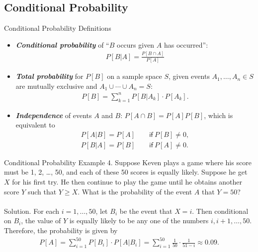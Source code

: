 \documentclass[hyperref={pdfpagelabels=false}]{beamer}
\newcommand{\U}{\mathsf}
\newcommand{\highlightg}[1]{\textcolor[rgb]{0.1,0.5,0.3}{\emph{\textbf{#1}}}}
\newcommand{\structb}[1]{\textcolor[rgb]{0.2,0.2,0.7}{#1}}
\begin{document}
\subsection{Conditional Probability}
%
\begin{frame}{Conditional Probability}
    \structb{Definitions}
    \begin{itemize}
    	\justifying
    	\item \highlightg{Conditional probability} of ``$B$ occurs given $A$ has occurred'': 
    	\begin{align*}
    	    P[B|A] = \frac{P[B\cap A]}{P[A]}
    	\end{align*}
    	\item \highlightg{Total probability} for $P[B]$ on a sample space $S$, given events $A_1, \ldots, A_n \in S$ are mutually exclusive and $A_1\cup\cdots\cup A_n = S$:
    	\begin{align*}
    	    P[B] = \sum_{k=1}^{n} P[B|A_k]\cdot P[A_k].
    	\end{align*}
    	\item \highlightg{Independence} of events $A$ and $B$: $P[A\cap B] = P[A]P[B]$, which is equivalent to
    	\begin{align*}
        	P[A|B] = P[A] \qquad \U{if}\ P[B]\neq 0, \\
        	P[B|A] = P[B] \qquad \U{if}\ P[A]\neq 0.
    	\end{align*}
    \end{itemize}
\end{frame}
%
\begin{frame}{Conditional Probability}
    \justifying
    \structb{Example 4.} Suppose Keven plays a game where his score must be 1, 2, \ldots, 50, and each of these 50 scores is equally likely. Suppose he get $X$ for his first try. He then continue to play the game until he obtains another score $Y$ such that $Y\geq X$. What is the probability of the event $A$ that $Y = 50$?
    ~\\
    ~\\
    \pause
    \justifying
    \structb{Solution.} For each $i = 1, \ldots, 50$, let $B_i$ be the event that $X = i$. Then conditional on $B_i$, the value of $Y$ is equally likely to be any one of the numbers $i, i + 1, \ldots, 50$. Therefore, the probability is given by
    \begin{align*}
        P[A] = \sum_{i=1}^{50} P[B_i]\cdot P[A|B_i] = \sum_{i=1}^{50} \frac{1}{50}\cdot \frac{1}{51-i} \approx 0.09.
    \end{align*}
\end{frame}
\end{document}
